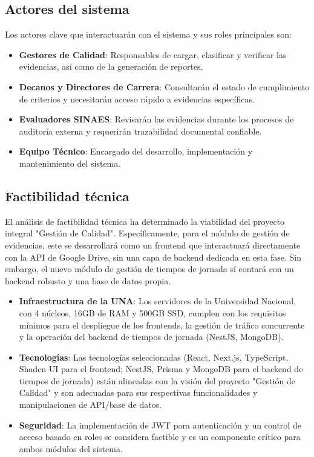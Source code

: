 \subsection{Actores del sistema}
Los actores clave que interactuarán con el sistema y sus roles principales son:
\begin{itemize}
    \item \textbf{Gestores de Calidad}: Responsables de cargar, clasificar y verificar las evidencias, así como de la generación de reportes.
    \item \textbf{Decanos y Directores de Carrera}: Consultarán el estado de cumplimiento de criterios y necesitarán acceso rápido a evidencias específicas.
    \item \textbf{Evaluadores SINAES}: Revisarán las evidencias durante los procesos de auditoría externa y requerirán trazabilidad documental confiable.
    \item \textbf{Equipo Técnico}: Encargado del desarrollo, implementación y mantenimiento del sistema.
\end{itemize}

\subsection{Factibilidad técnica}
El análisis de factibilidad técnica ha determinado la viabilidad del proyecto integral "Gestión de Calidad". Específicamente, para el módulo de gestión de evidencias, este se desarrollará como un frontend que interactuará directamente con la API de Google Drive, sin una capa de backend dedicada en esta fase. Sin embargo, el nuevo módulo de gestión de tiempos de jornada sí contará con un backend robusto y una base de datos propia.
\begin{itemize}
    \item \textbf{Infraestructura de la UNA}: Los servidores de la Universidad Nacional, con 4 núcleos, 16GB de RAM y 500GB SSD, cumplen con los requisitos mínimos para el despliegue de los frontends, la gestión de tráfico concurrente y la operación del backend de tiempos de jornada (NestJS, MongoDB).
    \item \textbf{Tecnologías}: Las tecnologías seleccionadas (React, Next.js, TypeScript, Shadcn UI para el frontend; NestJS, Prisma y MongoDB para el backend de tiempos de jornada) están alineadas con la visión del proyecto "Gestión de Calidad" y son adecuadas para sus respectivas funcionalidades y manipulaciones de API/base de datos.
    \item \textbf{Seguridad}: La implementación de JWT para autenticación y un control de acceso basado en roles se considera factible y es un componente crítico para ambos módulos del sistema.
\end{itemize}


